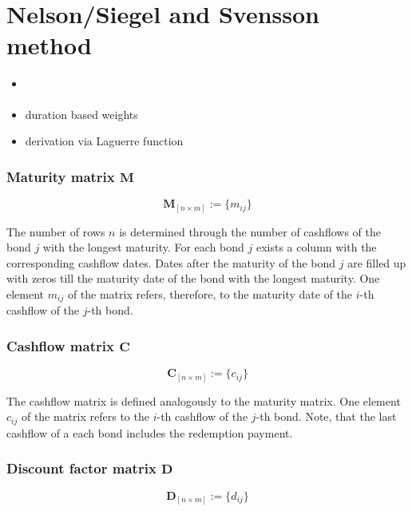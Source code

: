
\section{Nelson/Siegel and Svensson method}
\label{sec:nels-svenss-meth}


\begin{itemize}
\item \cite{Geyer1999}
\item duration based weights \cite{Bliss1997}
\item derivation via Laguerre function
\end{itemize}

\subsubsection*{Maturity matrix $\bm{M}$}

\begin{equation}\label{maturitym}
\bm{M}_{\left[n\times m\right]}:= \{m_{ij}\}
\end{equation}

The number of rows $n$ is determined through the number of cashflows of the bond $j$ with the longest maturity. For each bond $j$ exists a column with the corresponding cashflow dates. Dates after the maturity of the bond $j$ are filled up with zeros till the maturity date of the bond with the longest maturity. One element $m_{ij}$ of the matrix  refers, therefore, to the maturity date of  the $i$-th cashflow of the $j$-th bond.

\subsubsection*{Cashflow matrix $\bm{C}$}

 \begin{equation}\label{cashflowm}
\bm{C}_{\left[n\times m\right]}:= \{c_{ij}\}
\end{equation}

 The cashflow matrix is defined analogously to the maturity matrix.  One element $c_{ij}$  of the matrix refers to the $i$-th cashflow of the $j$-th bond. Note, that the last cashflow of a each bond includes the redemption payment.

\subsubsection*{Discount factor matrix $\bm{D}$}

 \begin{equation}\label{discountm}
\bm{D}_{\left[n\times m\right]}:= \{d_{ij}\}
\end{equation}

